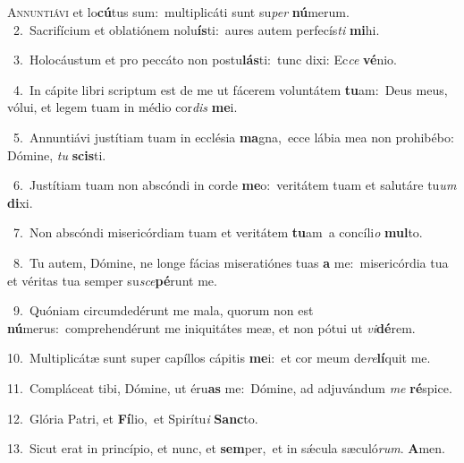 \lettrine{\initial\textcolor{\initialcolor}{A}}{nnuntiávi} et lo\-\textbf{cú}\-tus sum:~\star multiplicáti sunt su\textit{per} \textbf{nú}\-merum.\\
{\numbfont\textcolor{\numbcolor}{~2.}}~Sacrifícium et oblatiónem nolu\-\textbf{ís}\-ti:~\star aures autem perfecís\textit{ti} \textbf{mi}\-hi.\par
{\numbfont\textcolor{\numbcolor}{~3.}}~Holocáustum et pro peccáto non postu\-\textbf{lás}\-ti:~\star tunc dixi: Ec\textit{ce} \textbf{vé}\-nio.\par
{\numbfont\textcolor{\numbcolor}{~4.}}~In cápite libri scriptum est de me ut fácerem voluntátem \textbf{tu}\-am:~\star Deus meus, vólui, et legem tuam in médio cor\textit{dis} \textbf{me}\-i.\par
{\numbfont\textcolor{\numbcolor}{~5.}}~Annuntiávi justítiam tuam in ecclésia \textbf{ma}\-gna,~\star ecce lábia mea non prohibébo: Dómine, \textit{tu} \textbf{scis}\-ti.\par
{\numbfont\textcolor{\numbcolor}{~6.}}~Justítiam tuam non abscóndi in corde \textbf{me}\-o:~\star veritátem tuam et salutáre tu\textit{um} \textbf{di}\-xi.\par
{\numbfont\textcolor{\numbcolor}{~7.}}~Non abscóndi misericórdiam tuam et veritátem \textbf{tu}\-am~\star a concíli\textit{o} \textbf{mul}\-to.\par
{\numbfont\textcolor{\numbcolor}{~8.}}~Tu autem, Dómine, ne longe fácias miseratiónes tuas \textbf{a} me:~\star misericórdia tua et véritas tua semper su\-\textit{sce}\-\textbf{pé}runt me.\par
{\numbfont\textcolor{\numbcolor}{~9.}}~Quóniam circumdedérunt me mala, quorum non est \textbf{nú}\-merus:~\star comprehendérunt me iniquitátes meæ, et non pótui ut \textit{vi}\-\textbf{dé}rem.\par
{\numbfont\textcolor{\numbcolor}{10.}}~Multiplicátæ sunt super capíllos cápitis \textbf{me}\-i:~\star et cor meum de\-\textit{re}\-\textbf{lí}quit me.\par
{\numbfont\textcolor{\numbcolor}{11.}}~Compláceat tibi, Dómine, ut éru\textbf{as} me:~\star Dómine, ad adjuvándum \textit{me} \textbf{ré}\-spice.\par
{\numbfont\textcolor{\numbcolor}{12.}}~Glória Patri, et \textbf{Fí}\-lio,~\star et Spirítu\textit{i} \textbf{Sanc}\-to.\par
{\numbfont\textcolor{\numbcolor}{13.}}~Sicut erat in princípio, et nunc, et \textbf{sem}\-per,~\star et in sǽcula sæculó\-\textit{rum}\-. \textbf{A}\-men.\par
